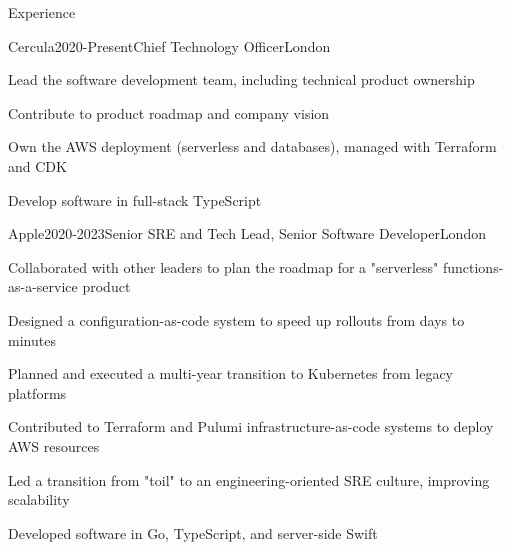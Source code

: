 \documentclass{resume} %
\begin{document}
\vspace{5 mm}

\begin{rSection}{Experience}

\begin{rSubsection}{{Cercula}}{2020-Present}{Chief Technology Officer}{London}
    \item Lead the software development team, including technical product ownership
    \item Contribute to product roadmap and company vision
    \item Own the AWS deployment (serverless and databases), managed with Terraform and CDK
    \item Develop software in full-stack TypeScript
\end{rSubsection}

\begin{rSubsection}{{Apple}}{2020-2023}{Senior SRE and Tech Lead, Senior Software Developer}{London}
    \item Collaborated with other leaders to plan the roadmap for a "serverless" functions-as-a-service product
    \item Designed a configuration-as-code system to speed up rollouts from days to minutes
    \item Planned and executed a multi-year transition to Kubernetes from legacy platforms
    \item Contributed to Terraform and Pulumi infrastructure-as-code systems to deploy AWS resources
    \item Led a transition from "toil" to an engineering-oriented SRE culture, improving scalability
    \item Developed software in Go, TypeScript, and server-side Swift
\end{rSubsection}


\end{rSection}
\end{document}
